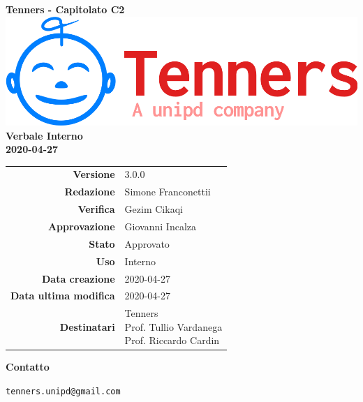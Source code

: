 \begin{titlepage}
	\begin{center}
		\large \textbf{Tenners - Capitolato C2}
		\vfill
		\includegraphics[scale = 0.3]{./res/img/logo.png}\\
		\vfill
		\Huge \textbf{Verbale Interno} \\
		\textbf {2020-04-27}

        \vfill
        \large

        \begin{tabular}{r|l}
                        \textbf{Versione} & 3.0.0 \\
                        \textbf{Redazione} & Simone Franconettii \\
                        \textbf{Verifica} & Gezim Cikaqi\\
                        \textbf{Approvazione} & Giovanni Incalza  \\
                        \textbf{Stato} & Approvato \\
                        \textbf{Uso} &  Interno\\
                        \textbf{Data creazione} &  2020-04-27\\
                        \textbf{Data ultima modifica} &  2020-04-27\\
                        \textbf{Destinatari} & \parbox[t]{5cm}{Tenners \\ Prof. Tullio Vardanega\\ Prof. Riccardo Cardin}
                \end{tabular}
                \vfill
                \normalsize
                \vfill
                \textbf{Contatto}

                \texttt{tenners.unipd@gmail.com}

	\end{center}
\end{titlepage}
